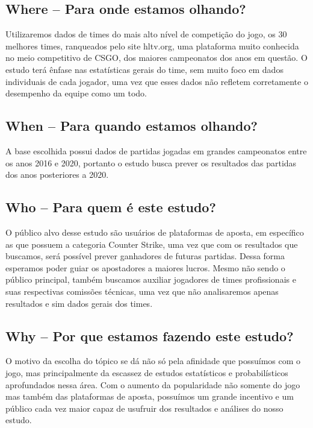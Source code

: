 \documentclass[a4paper,times,12pt]{article}
\begin{document}
\subsection{Where – Para onde estamos olhando?}
\hspace{+15pt}
Utilizaremos dados de times do mais alto nível de competição do jogo, os 30 melhores times, ranqueados pelo site hltv.org, uma plataforma muito conhecida no meio competitivo de CSGO, dos maiores campeonatos dos anos em questão. 
O estudo terá ênfase nas estatísticas gerais do time, sem muito foco em dados individuais de cada jogador, uma vez que esses dados não refletem corretamente o desempenho da equipe como um todo.

\subsection{When – Para quando estamos olhando?}
\hspace{+15pt}
A base escolhida possui dados de partidas jogadas em grandes campeonatos entre os anos 2016 e 2020, portanto o estudo busca prever os resultados das partidas dos anos posteriores a 2020.

\subsection{Who – Para quem é este estudo?}
\hspace{+15pt}
O público alvo desse estudo são usuários de plataformas de aposta, em específico as que possuem a categoria Counter Strike, uma vez que com os resultados que buscamos, será possível prever ganhadores de futuras partidas. Dessa forma esperamos poder guiar os apostadores a maiores lucros.
Mesmo não sendo o público principal, também buscamos auxiliar jogadores de times profissionais e suas respectivas comissões técnicas, uma vez que não analisaremos apenas resultados e sim dados gerais dos times.

\subsection{Why – Por que estamos fazendo este estudo?}
\hspace{+15pt}
O motivo da escolha do tópico se dá não só pela afinidade que possuímos com o jogo, mas principalmente da escassez de estudos estatísticos e probabilísticos aprofundados nessa área. 
Com o aumento da popularidade não somente do jogo mas também das plataformas de aposta, possuímos um grande incentivo e um público cada vez maior capaz de usufruir dos resultados e análises do nosso estudo.
\end{document}
